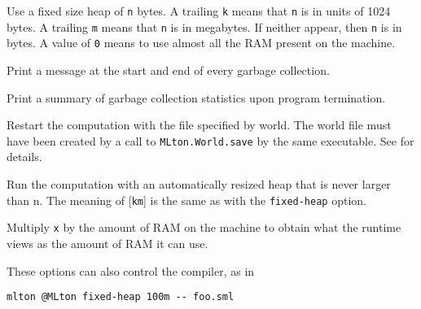 \begin{description}
 Use a fixed size heap of {\tt n} bytes.
 A trailing {\tt k} means that {\tt n} is in units of 1024 bytes. 
 A trailing {\tt m} means that {\tt n} is in megabytes. 
 If neither appear, then {\tt n} is in bytes.
 A value of {\tt 0} means to use almost all the RAM present on the
 machine.

Print a message at the start and end of every garbage collection.

Print a summary of garbage collection statistics upon program
termination.

Restart the computation with the file specified by world.
The world file must have been created by a call to
{\tt MLton.World.save} by the same executable.  See 
for details.

Run the computation with an automatically resized heap that is never
larger than n.  The meaning of [{\tt km}] is the same as with the
{\tt fixed-heap} option.

Multiply {\tt x} by the amount of RAM on the machine to obtain what
the runtime views as the amount of RAM it can use.
\end{description}
These options can also control the compiler, as in
\begin{verbatim}
mlton @MLton fixed-heap 100m -- foo.sml
\end{verbatim}
